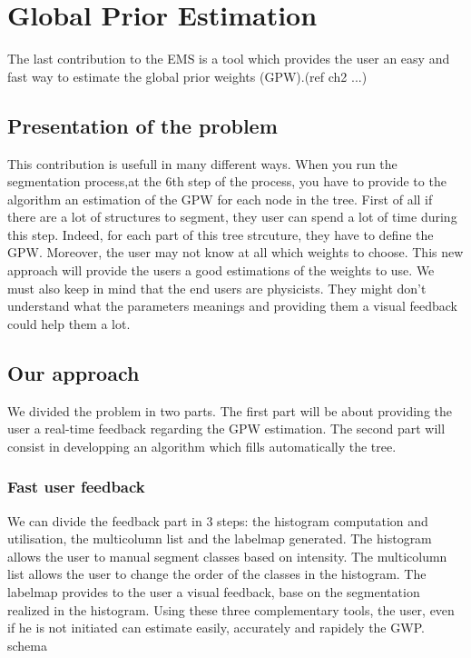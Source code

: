 \section{Global Prior Estimation}

The last contribution to the EMS is a tool which provides the user an easy and fast way to estimate the global prior weights (GPW).(ref ch2 ...)

\subsection{Presentation of the problem}
This contribution is usefull in many different ways.
When you run the segmentation process,at the 6th step of the process, you have to provide to the algorithm an estimation of the GPW for each node in the tree. 
First of all if there are a lot of structures to segment, they user can spend a lot of time during this step. Indeed, for each part of this tree strcuture, they have to define the GPW. Moreover, the user may not know at all which weights to choose. This new approach will provide the users a good estimations of the weights to use. We must also keep in mind that the end users are physicists. They might don't understand what the parameters meanings and providing them a visual feedback could help them a lot.
\subsection{Our approach}
We divided the problem in two parts. The first part will be about providing the user a real-time feedback regarding the GPW estimation.
The second part will consist in developping an algorithm which fills automatically the tree.
\subsubsection{Fast user feedback}
We can divide the feedback part in 3 steps: the histogram computation and utilisation, the multicolumn list and the labelmap generated.
The histogram allows the user to manual segment classes based on intensity.
The multicolumn list allows the user to change the order of the classes in the histogram.
The labelmap provides to the user a visual feedback, base on the segmentation realized in the histogram.
Using these three complementary tools, the user, even if he is not initiated can estimate easily, accurately and rapidely the GWP.
\\schema

